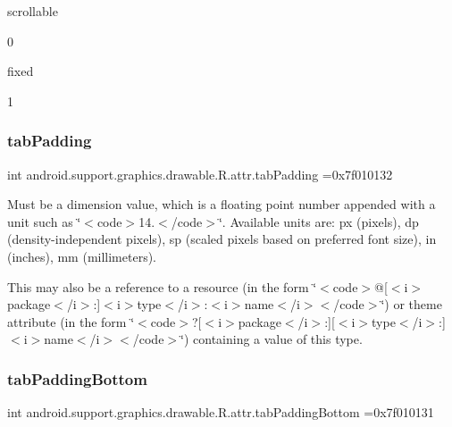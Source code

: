 {\ttfamily scrollable}

0

{\ttfamily fixed}

1\mbox{\label{classandroid_1_1support_1_1graphics_1_1drawable_1_1R_1_1attr_aabc68d7e331010857d70da2c496922bd}} 
\subsubsection{\texorpdfstring{tab\+Padding}{tabPadding}}
{\footnotesize\ttfamily int android.\+support.\+graphics.\+drawable.\+R.\+attr.\+tab\+Padding =0x7f010132\hspace{0.3cm}{\ttfamily [static]}}

Must be a dimension value, which is a floating point number appended with a unit such as \char`\"{}$<$code$>$14.\+5sp$<$/code$>$\char`\"{}. Available units are\+: px (pixels), dp (density-\/independent pixels), sp (scaled pixels based on preferred font size), in (inches), mm (millimeters). 

This may also be a reference to a resource (in the form \char`\"{}$<$code$>$@\mbox{[}$<$i$>$package$<$/i$>$\+:\mbox{]}$<$i$>$type$<$/i$>$\+:$<$i$>$name$<$/i$>$$<$/code$>$\char`\"{}) or theme attribute (in the form \char`\"{}$<$code$>$?\mbox{[}$<$i$>$package$<$/i$>$\+:\mbox{]}\mbox{[}$<$i$>$type$<$/i$>$\+:\mbox{]}$<$i$>$name$<$/i$>$$<$/code$>$\char`\"{}) containing a value of this type. \mbox{\label{classandroid_1_1support_1_1graphics_1_1drawable_1_1R_1_1attr_a942c0b202e751ef1f231b4c34330478b}} 
\subsubsection{\texorpdfstring{tab\+Padding\+Bottom}{tabPaddingBottom}}
{\footnotesize\ttfamily int android.\+support.\+graphics.\+drawable.\+R.\+attr.\+tab\+Padding\+Bottom =0x7f010131\hspace{0.3cm}{\ttfamily [static]}}

